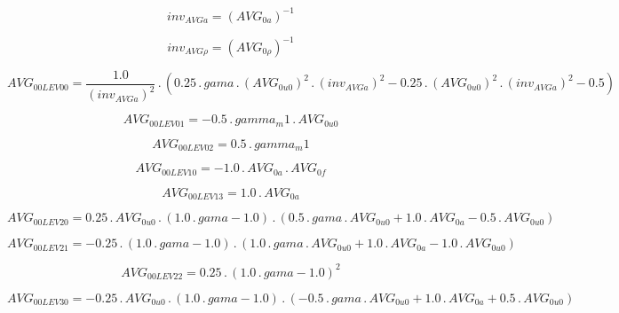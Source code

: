 \documentclass{article}
\begin{document}
\begin{dmath}inv_{AVG a} = \left(AVG_{0 a} \right)^{-1}\end{dmath}

\begin{dmath}inv_{AVG \rho} = \left(AVG_{0 \rho} \right)^{-1}\end{dmath}

\begin{dmath}AVG_{0 0 LEV 00} = \frac{1.0}{\left(inv_{AVG a} \right)^{2}} \,.\, \left(0.25 \,.\, gama \,.\, \left(AVG_{0 u0} \right)^{2} \,.\, \left(inv_{AVG a} \right)^{2} - 0.25 \,.\, \left(AVG_{0 u0} \right)^{2} \,.\, \left(inv_{AVG a} \right)^{2} 
- 0.5\right)\end{dmath}

\begin{dmath}AVG_{0 0 LEV 01} = - 0.5 \,.\, gamma_m1 \,.\, AVG_{0 u0}\end{dmath}

\begin{dmath}AVG_{0 0 LEV 02} = 0.5 \,.\, gamma_m1\end{dmath}

\begin{dmath}AVG_{0 0 LEV 10} = - 1.0 \,.\, AVG_{0 a} \,.\, AVG_{0 f}\end{dmath}

\begin{dmath}AVG_{0 0 LEV 13} = 1.0 \,.\, AVG_{0 a}\end{dmath}

\begin{dmath}AVG_{0 0 LEV 20} = 0.25 \,.\, AVG_{0 u0} \,.\, \left(1.0 \,.\, gama - 1.0\right) \,.\, \left(0.5 \,.\, gama \,.\, AVG_{0 u0} + 1.0 \,.\, AVG_{0 a} - 0.5 \,.\, AVG_{0 u0}\right)\end{dmath}

\begin{dmath}AVG_{0 0 LEV 21} = - 0.25 \,.\, \left(1.0 \,.\, gama - 1.0\right) \,.\, \left(1.0 \,.\, gama \,.\, AVG_{0 u0} + 1.0 \,.\, AVG_{0 a} - 1.0 \,.\, AVG_{0 u0}\right)\end{dmath}

\begin{dmath}AVG_{0 0 LEV 22} = 0.25 \,.\, \left(1.0 \,.\, gama - 1.0 \right)^{2}\end{dmath}

\begin{dmath}AVG_{0 0 LEV 30} = - 0.25 \,.\, AVG_{0 u0} \,.\, \left(1.0 \,.\, gama - 1.0\right) \,.\, \left(- 0.5 \,.\, gama \,.\, AVG_{0 u0} + 1.0 \,.\, AVG_{0 a} + 0.5 \,.\, AVG_{0 u0}\right)\end{dmath}
\end{document}
